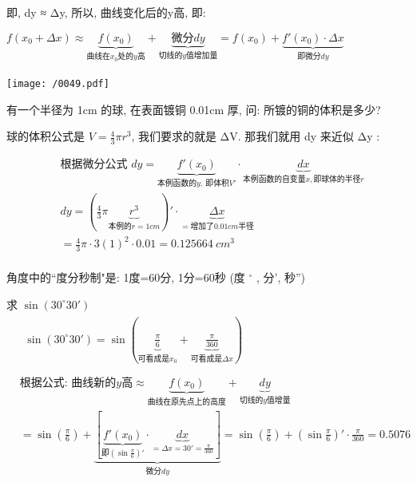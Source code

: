 \documentclass[UTF8]{ctexart}
\begin{document}
	即, dy ≈ Δy, 所以, 曲线变化后的y高, 即:
	
	 $f\left( x_0+\varDelta x \right) \approx \underset{\text{曲线在}x_0\text{处的}y\text{高}}{\underbrace{f\left( x_0 \right) }}+\underset{\text{切线的}y\text{值增加量}}{\underbrace{\text{微分}dy}}=f\left( x_0 \right) +\underset{\text{即微分}dy}{\underbrace{f'\left( x_0 \right) \cdot \varDelta x}}$ \\
	\\
	
	\texttt{[image: /0049.pdf]}
	
	
	\begin{myEnvSample}
		有一个半径为 1cm 的球, 在表面镀铜 0.01cm 厚, 问: 所镀的铜的体积是多少?
		
		球的体积公式是 $V=\frac{4}{3}\pi r^3$, 我们要求的就是 ΔV. 那我们就用 dy 来近似 Δy :			
		
		\begin{align*}
	&\text{根据微分公式\ }dy=\underset{\text{本例函数的}y,\ \text{即体积}V'}{\underbrace{f'\left( x_0 \right) }}\cdot \underset{\text{本例函数的自变量}x,\text{即球体的半径}r}{\underbrace{dx}}\\
&dy=\left( \frac{4}{3}\pi \underset{\text{本例的}r=1cm}{\underbrace{r^3}} \right) '\cdot \underset{=\text{增加了}0.01cm\text{半径}}{\underbrace{\varDelta x}}\\
&=\frac{4}{3}\pi \cdot 3\left( 1 \right) ^2\cdot 0.01=0.125664\ cm^3\\
		\end{align*}
	\end{myEnvSample} 



\begin{myEnvSample}
	角度中的``度分秒制"是: 1度=60分, 1分=60秒 (度 $^\circ$ , 分', 秒'')
	
	求 $\sin \left( 30^\circ 30' \right) $
	\begin{align*}
	&\begin{matrix}
	\sin \left( 30^{\circ}30' \right) =\sin \left( \underset{\text{可看成是}x_0}{\underbrace{\frac{\pi}{6}}}+\underset{\text{可看成是}\varDelta x}{\underbrace{\frac{\pi}{360}}} \right)\\
\end{matrix}\\
&\text{根据公式:\ 曲线新的}y\text{高}\approx \underset{\text{曲线在原先点上的高度}}{\underbrace{f\left( x_0 \right) }}+\underset{\text{切线的}y\text{值增量}}{\underbrace{dy}}\\
&=\sin \left( \frac{\pi}{6} \right) +\underset{\text{微分}dy}{\underbrace{\left[ \underset{\text{即}\left( \sin \frac{\pi}{6} \right) '}{\underbrace{f'\left( x_0 \right) }}\cdot \underset{=\varDelta x=30'=\frac{\pi}{360}}{\underbrace{dx}} \right] }}=\sin \left( \frac{\pi}{6} \right) +\left( \sin \frac{\pi}{6} \right) '\cdot \frac{\pi}{360}=0.5076
	\end{align*}
\end{myEnvSample}
	
\end{document}
